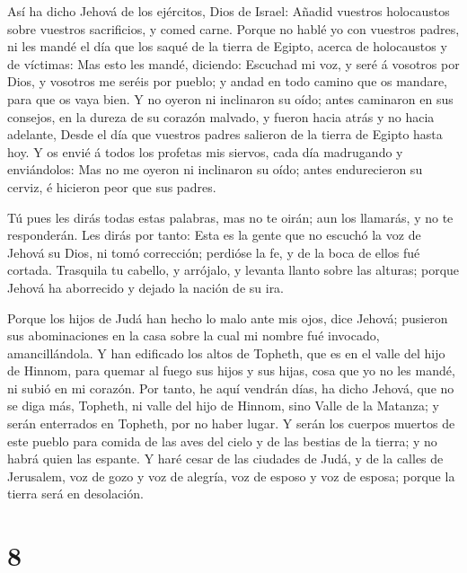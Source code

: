  Así ha dicho Jehová de los ejércitos, Dios de Israel:
Añadid vuestros holocaustos sobre vuestros sacrificios, y comed carne.
 Porque no hablé yo con vuestros padres, ni les mandé el
día que los saqué de la tierra de Egipto, acerca de holocaustos y de
víctimas:  Mas esto les mandé, diciendo: Escuchad mi voz, y
seré á vosotros por Dios, y vosotros me seréis por pueblo; y andad en
todo camino que os mandare, para que os vaya bien.  Y no
oyeron ni inclinaron su oído; antes caminaron en sus consejos, en la
dureza de su corazón malvado, y fueron hacia atrás y no hacia adelante,
 Desde el día que vuestros padres salieron de la tierra de
Egipto hasta hoy. Y os envié á todos los profetas mis siervos, cada día
madrugando y enviándolos:  Mas no me oyeron ni inclinaron
su oído; antes endurecieron su cerviz, é hicieron peor que sus padres.

 Tú pues les dirás todas estas palabras, mas no te oirán;
aun los llamarás, y no te responderán.  Les dirás por
tanto: Esta es la gente que no escuchó la voz de Jehová su Dios, ni tomó
corrección; perdióse la fe, y de la boca de ellos fué cortada.
 Trasquila tu cabello, y arrójalo, y levanta llanto sobre
las alturas; porque Jehová ha aborrecido y dejado la nación de su ira.

 Porque los hijos de Judá han hecho lo malo ante mis ojos,
dice Jehová; pusieron sus abominaciones en la casa sobre la cual mi
nombre fué invocado, amancillándola.  Y han edificado los
altos de Topheth, que es en el valle del hijo de Hinnom, para quemar al
fuego sus hijos y sus hijas, cosa que yo no les mandé, ni subió en mi
corazón.  Por tanto, he aquí vendrán días, ha dicho Jehová,
que no se diga más, Topheth, ni valle del hijo de Hinnom, sino Valle de
la Matanza; y serán enterrados en Topheth, por no haber lugar.
 Y serán los cuerpos muertos de este pueblo para comida de
las aves del cielo y de las bestias de la tierra; y no habrá quien las
espante.  Y haré cesar de las ciudades de Judá, y de la
calles de Jerusalem, voz de gozo y voz de alegría, voz de esposo y voz
de esposa; porque la tierra será en desolación.

\hypertarget{section-7}{%
\section{8}\label{section-7}}

